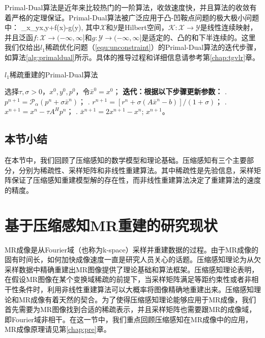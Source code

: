 Primal-Dual\cite{pd}算法是近年来比较热门的一阶算法，收敛速度快，并且算法的收敛有着严格的定理保证。Primal-Dual算法被广泛应用于凸-凹鞍点问题的极大极小问题中：
\beq
\min_{x\in{}}\max_{y\in{}}\quad\langle {}x,y\rangle+f(x)-g(y),
\label{equ:saddle}
\eeq
其中$\mathcal{X}$和$\mathcal{Y}$是Hilbert空间，$\mathcal{K}:\mathcal{X}\rightarrow\mathcal{Y}$是线性连续映射，并且泛函$f:\mathcal{X}\rightarrow(-\infty,\infty]$和$g:\mathcal{Y}\rightarrow(-\infty,\infty]$是适定的、凸的和下半连续的。这里我们仅给出$l_1$稀疏优化问题（\ref{equ:unconstraint}）的Primal-Dual算法的迭代步骤，如算法\ref{alg:primaldual}所示。具体的推导过程和详细信息请参考第\ref{chap:tgvlr}章。
\begin{algorithm}
	\caption{$l_1$稀疏重建的Primal-Dual算法}
	\label{alg:primaldual}
	\begin{algorithmic}
		\REQUIRE 选择$\tau, \sigma>0$，$x^0,y^0,p^0$，令$\bar{x}^0=x^0$；
		\INDSTATE[-1.25] \textbf{迭代：根据以下步骤更新参数：}	
		. $p^{n+1}=\mathcal{P}_\alpha(p^n+\sigma\bar{x}^n)$；
		. $r^{n+1}=[r^n+\sigma(A\bar{x}^n-b)]/(1+\sigma)$；
		. $x^{n+1}=x^n-\tau A^Hp^n$；
		. $\bar{x}^{n+1}=2x^{n+1}-x^n$;
		\ENSURE $x^{n+1}$。
	\end{algorithmic}
\end{algorithm}

\subsection{本节小结}
在本节中，我们回顾了压缩感知的数学模型和理论基础。压缩感知有三个主要部分，分别为稀疏性、采样矩阵和非线性重建算法。其中稀疏性是先验信息，采样矩阵保证了压缩感知重建模型解的存在性，而非线性重建算法决定了重建算法的速度的精度。

\section{基于压缩感知MR重建的研究现状}
\label{sec:csmri}
MR成像是从Fourier域（也称为k-space）采样并重建数据的过程。由于MR成像的固有时间长，如何加快成像速度一直是研究人员关心的话题。压缩感知理论为从欠采样数据中精确重建出MR图像提供了理论基础和算法框架。压缩感知理论表明，在假设MR图像在某个变换域稀疏的前提下，当采样矩阵满足等距约束性或者非相干性条件时\cite{Donoho2006Compressed}，利用非线性重建算法可以大概率将图像精确地重建出来。压缩感知理论和MR成像有着天然的契合。为了使得压缩感知理论能够应用于MR成像，我们首先需要为MR图像找到合适的稀疏表示，并且采样矩阵也需要跟MR的成像域，即Fourier域非相干。在这一节中，我们重点回顾压缩感知在MR成像中的应用，MR成像原理请见第\ref{chap:pre}章。


